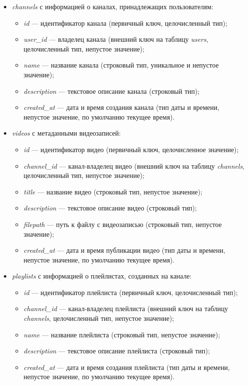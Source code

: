 \begin{itemize}
    \item \textit{channels} с информацией о каналах, принадлежащих пользователям:
    \begin{itemize}
        \item \textit{id} --- идентификатор канала (первичный ключ, целочисленный тип);
        \item \textit{user\_id} --- владелец канала (внешний ключ на таблицу \textit{users}, целочисленный тип, непустое значение);
        \item \textit{name} --- название канала (строковый тип, уникальное и непустое значение);
        \item \textit{description} --- текстовое описание канала (строковый тип);
        \item \textit{created\_at} --- дата и время создания канала (тип даты и времени, непустое значение, по умолчанию текущее время).
    \end{itemize}

    \item \textit{videos} с метаданными видеозаписей:
    \begin{itemize}
        \item \textit{id} --- идентификатор видео (первичный ключ, целочисленное значение);
        \item \textit{channel\_id} --- канал-владелец видео (внешний ключ на таблицу \textit{channels}, целочисленный тип, непустое значение);
        \item \textit{title} --- название видео (строковый тип, непустое значение);
        \item \textit{description} --- текстовое описание видео (строковый тип);
        \item \textit{filepath} --- путь к файлу с видеозаписью (строковый тип, непустое значение);
        \item \textit{created\_at} --- дата и время публикации видео (тип даты и времени, непустое значение, по умолчанию текущее время).
    \end{itemize}

    \item \textit{playlists} с информацией о плейлистах, созданных на канале:
    \begin{itemize}
        \item \textit{id} --- идентификатор плейлиста (первичный ключ, целочисленный тип);
        \item \textit{channel\_id} --- канал-владелец плейлиста (внешний ключ на таблицу \textit{channels}, целочисленный тип, непустое значение);
        \item \textit{name} --- название плейлиста (строковый тип, непустое значение);
        \item \textit{description} --- текстовое описание плейлиста (строковый тип);
        \item \textit{created\_at} --- дата и время создания плейлиста (тип даты и времени, непустое значение, по умолчанию текущее время).
    \end{itemize}


\end{itemize}
